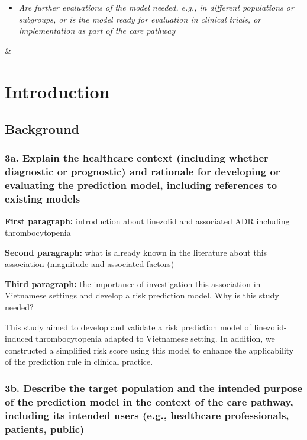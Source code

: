\documentclass[
  letterpaper,
  DIV=11,
  numbers=noendperiod]{scrartcl}
\providecommand{\tightlist}{%
  \setlength{\itemsep}{0pt}\setlength{\parskip}{0pt}}\usepackage{longtable,booktabs,array}
\begin{document}
\begin{longtable}[]
\begin{minipage}[t]{\linewidth}
\begin{itemize}
\tightlist
\item
  \emph{Are further evaluations of the model needed, e.g., in different
  populations or subgroups, or is the model ready for evaluation in
  clinical trials, or implementation as part of the care pathway}
\end{itemize}
\end{minipage} & \\
\end{longtable}

\section{Introduction}\label{introduction}

\subsection{Background}\label{background}

\subsubsection{3a. Explain the healthcare context (including whether
diagnostic or prognostic) and rationale for developing or evaluating the
prediction model, including references to existing
models}\label{a.-explain-the-healthcare-context-including-whether-diagnostic-or-prognostic-and-rationale-for-developing-or-evaluating-the-prediction-model-including-references-to-existing-models}

\textbf{First paragraph:} introduction about linezolid and associated
ADR including thrombocytopenia

\textbf{Second paragraph:} what is already known in the literature about
this association (magnitude and associated factors)

\textbf{Third paragraph:} the importance of investigation this
association in Vietnamese settings and develop a risk prediction model.
Why is this study needed?

This study aimed to develop and validate a risk prediction model of
linezolid-induced thrombocytopenia adapted to Vietnamese setting. In
addition, we constructed a simplified risk score using this model to
enhance the applicability of the prediction rule in clinical practice.

\subsubsection{3b. Describe the target population and the intended
purpose of the prediction model in the context of the care pathway,
including its intended users (e.g., healthcare professionals, patients,
public)}\label{b.-describe-the-target-population-and-the-intended-purpose-of-the-prediction-model-in-the-context-of-the-care-pathway-including-its-intended-users-e.g.-healthcare-professionals-patients-public}
\end{document}
